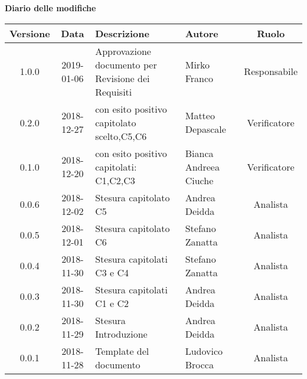 \begin{center}
		\textbf{Diario delle modifiche}
	\end{center}
	\begin{center}
		\begin{tabularx}{\textwidth}{|c|c|X|X|c|}
			\hline
			\textbf{Versione} & \textbf{Data} & \textbf{Descrizione} & \textbf{Autore} & \textbf{Ruolo} \\
			\hline
			1.0.0 & 2019-01-06 & Approvazione documento per Revisione dei Requisiti & Mirko Franco & Responsabile \\
			\hline
			0.2.0 & 2018-12-27 & \glossario{Verifica} con esito positivo capitolato scelto,C5,C6  & Matteo Depascale & Verificatore \\
			\hline 
			0.1.0 & 2018-12-20 & \glossario{Verifica} con esito positivo  capitolati: C1,C2,C3 & Bianca Andreea Ciuche & Verificatore \\
			\hline
			0.0.6 & 2018-12-02 & Stesura capitolato C5& Andrea Deidda & Analista \\
			\hline
			0.0.5 & 2018-12-01 & Stesura capitolato C6 & Stefano Zanatta & Analista \\
			\hline
			0.0.4 & 2018-11-30 & Stesura capitolati C3 e C4 & Stefano Zanatta & Analista \\
			\hline
			0.0.3 & 2018-11-30 & Stesura capitolati C1 e C2 & Andrea Deidda & Analista \\
			\hline
			0.0.2 & 2018-11-29 & Stesura Introduzione & Andrea Deidda & Analista \\
			\hline
			0.0.1 &  2018-11-28& Template  del documento & Ludovico Brocca & Analista\\
			\hline
		\end{tabularx}
	\end{center}
\newpage